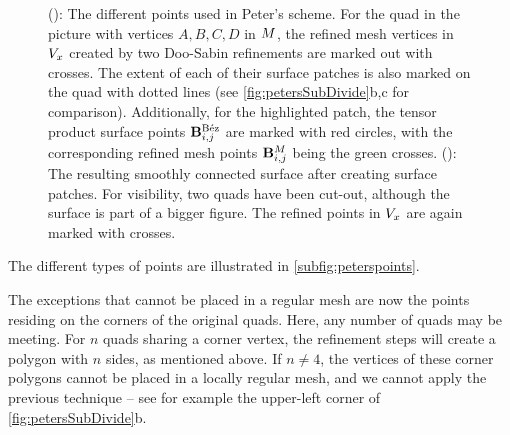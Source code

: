 \begin{figure}
\begin{center}
\begin{subfigure}[b]{.49\textwidth}
\begin{center}
\label{subfig:smoothsurf}
\end{center}
\end{subfigure}
\caption{(): The different points used in Peter's scheme. For the quad in the picture with vertices $A,B,C,D$ in $\petersControlMesh$, the refined mesh vertices in $\petersPatchPoints$ created by two Doo-Sabin refinements are marked out with crosses. The extent of each of their \Bez surface patches is also marked on the quad with dotted lines (see \autoref{fig:petersSubDivide}b,c for comparison). Additionally, for the highlighted patch, the tensor product \Bez surface points $\petersLocalBezPointIndices{i,j}$ are marked with red circles, with the corresponding refined mesh points $\petersLocalPatchPointIndices{i,j}$ being the green crosses. (): The resulting smoothly connected surface after creating \Bez surface patches. For visibility, two quads have been cut-out, although the surface is part of a bigger figure. The refined points in $\petersPatchPoints$ are again marked with crosses.}
\label{fig:petersDiags}
\end{center}
\end{figure}

The different types of points are illustrated in \autoref{subfig:peterspoints}.


%

The exceptions that cannot be placed in a regular mesh are now the points residing on the corners of the original quads. 
Here, any number of quads may be meeting.
 For $n$ quads sharing a corner vertex, the refinement steps will create a polygon with $n$ sides, as mentioned above. If $n\neq4$, the vertices of these corner polygons cannot be placed in a locally regular mesh, and we cannot apply the previous technique -- see for example the upper-left corner of \autoref{fig:petersSubDivide}b.

